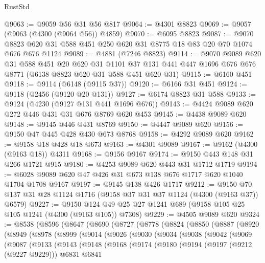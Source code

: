 \begin{lexlean}{RustStd}
\begin{coremodule}
@9063 := @9059 @56 @31 @56 @817
@9064 := @4301 @8823
@9069 := @9057 (@9063 (@4300 (@9064 @56)) @4859)
@9070 := @6095 @8823
@9087 := @9070 @8823 @620 @31 @588 @451 @250 @620 @31 @8775 @18 @83 @20 @70 @1074 @676 @676 @1124
@9089 := @4881 (@7246 @8823)
@9114 := @9070
    @9089
    @620
    @31
    @588
    @451
    @20
    @620
    @31
    @1101
    @37
    @131
    @441
    @447
    @1696
    @676
    @676
    @8771
    (@6138 @8823 @620 @31 @588 @451 @620 @31)
@9115 := @6160 @451
@9118 := @9114 (@6148 (@9115 @37))
@9120 := @6166 @31 @451
@9124 := @9118 (@2456 (@9120 @20 @131))
@9127 := @6174 @8823 @31 @588
@9133 := @9124 (@4230 (@9127 @131 @441 @1696 @676))
@9143 := @4424 @9089 @620 @272 @446 @431 @31 @676 @8769 @620 @453
@9145 := @4438 @9089 @620
@9148 := @9145 @446 @431 @8769
@9150 := @4447 @9089 @620
@9156 := @9150 @47 @445 @428 @430 @673 @8768
@9158 := @4292 @9089 @620
@9162 := @9158 @18 @428 @18 @673
@9163 := @4301 @9089
@9167 := @9162 (@4300 (@9163 @18)) @4311
@9168 := @9156 @9167
@9174 := @9150 @443 @148 @31 @266 @1721 @915
@9180 := @4253 @9089 @620 @443 @31 @1712 @1719
@9194 := @6028 @9089 @620 @47 @426 @31 @673 @138 @676 @1717 @620 @1040 @1704 @1708 @9167
@9197 := @9145 @138 @426 @1717
@9212 := @9150 @70 @137 @31 @28 @1124 @1716 (@9158 @37 @31 @37 @1124 (@4300 (@9163 @37)) @6579)
@9227 := @9150 @124 @49 @25 @27 @1241 @689 (@9158 @105 @25 @105 @1241 (@4300 (@9163 @105)) @7308)
@9229 := @4505 @9089 @620
@9324 := @8538
    (@8596
      (@8647
        (@8690
          (@8727
            (@8778
              (@8824
                (@8850
                  (@8887
                    (@8920
                      (@8949
                        (@8978
                          (@8999
                            (@9014
                              (@9026
                                (@9030
                                  (@9034
                                    (@9038
                                      (@9042
                                        (@9069
                                          (@9087
                                            (@9133
                                              (@9143
                                                (@9148
                                                  (@9168
                                                    (@9174
                                                      (@9180
                                                        (@9194
                                                          (@9197 (@9212 (@9227 @9229)))
                                                          @6831
                                                          @6841

\end{coremodule}
\end{lexlean}
